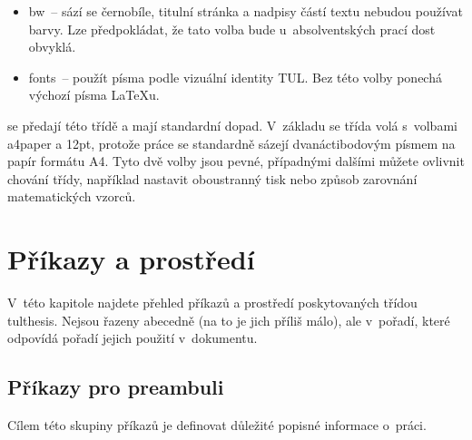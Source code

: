 \documentclass[FM,BP]{tulthesis}
\newcommand{\argument}[1]{{\ttfamily\color{\tulcolor}#1}}
\newcommand{\argumentindex}[1]{\argument{#1}\index{#1}}
\begin{document}
\begin{description}
\begin{itemize}
\item \argumentindex{bw}~-- sází se černobíle, titulní stránka a nadpisy částí
textu nebudou používat barvy. Lze předpokládat, že tato volba bude
u~absolventských prací dost obvyklá.

\item \argumentindex{fonts}~-- použít písma podle vizuální identity TUL. Bez
této volby ponechá výchozí písma \LaTeX u.
\end{itemize}

\item[Volby třídy \argument{report} (resp. \argument{article})] se předají této
třídě a mají standardní dopad. V~základu se třída volá s~volbami
\argument{a4paper} a \argument{12pt}, protože práce se standardně sázejí
dvanáctibodovým písmem na papír formátu A4. Tyto dvě volby jsou pevné,
případnými dalšími můžete ovlivnit chování třídy, například nastavit
oboustranný tisk nebo způsob zarovnání matematických vzorců.

\end{description}


\chapter{Příkazy a prostředí}

V~této kapitole najdete přehled příkazů a prostředí poskytovaných třídou
\argument{tulthesis}. Nejsou řazeny abecedně (na to je jich příliš málo), ale
v~pořadí, které odpovídá pořadí jejich použití v~dokumentu.


\section{Příkazy pro preambuli}\label{deklarace}

Cílem této skupiny příkazů je definovat důležité popisné informace o~práci.
\end{document}
